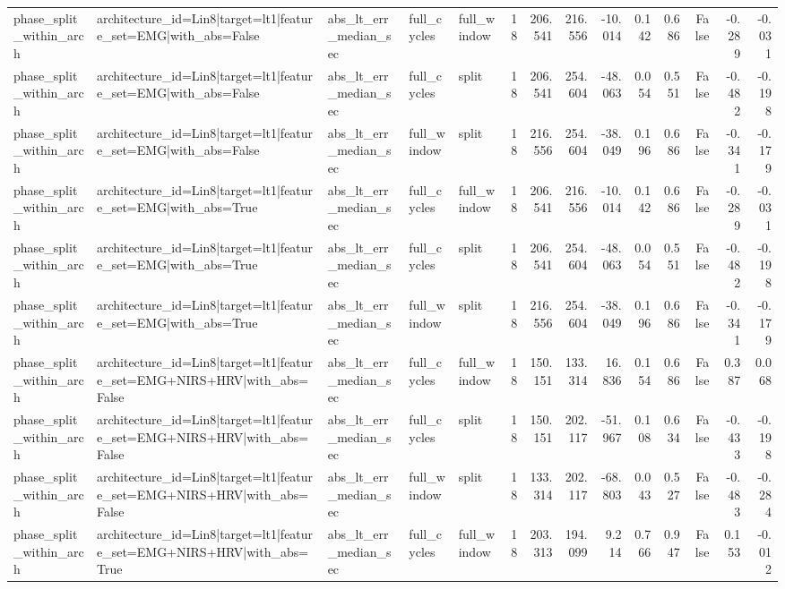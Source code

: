 \begin{table}
\begin{tabular}{lllllrrrrrrrrr}
phase_split_within_arch & architecture_id=Lin8|target=lt1|feature_set=EMG|with_abs=False & abs_lt_err_median_sec & full_cycles & full_window & 18 & 206.541 & 216.556 & -10.014 & 0.142 & 0.686 & False & -0.289 & -0.031 \\
phase_split_within_arch & architecture_id=Lin8|target=lt1|feature_set=EMG|with_abs=False & abs_lt_err_median_sec & full_cycles & split & 18 & 206.541 & 254.604 & -48.063 & 0.054 & 0.551 & False & -0.482 & -0.198 \\
phase_split_within_arch & architecture_id=Lin8|target=lt1|feature_set=EMG|with_abs=False & abs_lt_err_median_sec & full_window & split & 18 & 216.556 & 254.604 & -38.049 & 0.196 & 0.686 & False & -0.341 & -0.179 \\
phase_split_within_arch & architecture_id=Lin8|target=lt1|feature_set=EMG|with_abs=True & abs_lt_err_median_sec & full_cycles & full_window & 18 & 206.541 & 216.556 & -10.014 & 0.142 & 0.686 & False & -0.289 & -0.031 \\
phase_split_within_arch & architecture_id=Lin8|target=lt1|feature_set=EMG|with_abs=True & abs_lt_err_median_sec & full_cycles & split & 18 & 206.541 & 254.604 & -48.063 & 0.054 & 0.551 & False & -0.482 & -0.198 \\
phase_split_within_arch & architecture_id=Lin8|target=lt1|feature_set=EMG|with_abs=True & abs_lt_err_median_sec & full_window & split & 18 & 216.556 & 254.604 & -38.049 & 0.196 & 0.686 & False & -0.341 & -0.179 \\
phase_split_within_arch & architecture_id=Lin8|target=lt1|feature_set=EMG+NIRS+HRV|with_abs=False & abs_lt_err_median_sec & full_cycles & full_window & 18 & 150.151 & 133.314 & 16.836 & 0.154 & 0.686 & False & 0.387 & 0.068 \\
phase_split_within_arch & architecture_id=Lin8|target=lt1|feature_set=EMG+NIRS+HRV|with_abs=False & abs_lt_err_median_sec & full_cycles & split & 18 & 150.151 & 202.117 & -51.967 & 0.108 & 0.634 & False & -0.433 & -0.198 \\
phase_split_within_arch & architecture_id=Lin8|target=lt1|feature_set=EMG+NIRS+HRV|with_abs=False & abs_lt_err_median_sec & full_window & split & 18 & 133.314 & 202.117 & -68.803 & 0.043 & 0.527 & False & -0.483 & -0.284 \\
phase_split_within_arch & architecture_id=Lin8|target=lt1|feature_set=EMG+NIRS+HRV|with_abs=True & abs_lt_err_median_sec & full_cycles & full_window & 18 & 203.313 & 194.099 & 9.214 & 0.766 & 0.947 & False & 0.153 & -0.012 \\

\end{tabular}
\end{table}
